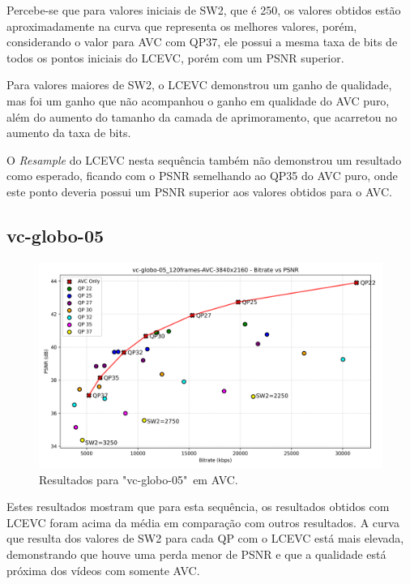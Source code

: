 Percebe-se que para valores iniciais de SW2, que é 250, os valores
obtidos estão aproximadamente na curva que representa os melhores valores, porém, considerando
o valor para \acrshort{AVC} com QP37, ele possui a mesma taxa de bits de todos os pontos
iniciais do \acrshort{LCEVC}, porém com um \acrshort{PSNR} superior.

Para valores maiores de SW2, o \acrshort{LCEVC} demonstrou um ganho de qualidade, mas foi
um ganho que não acompanhou o ganho em qualidade do \acrshort{AVC} puro, além do aumento
do tamanho da camada de aprimoramento, que acarretou no aumento da taxa de bits.

O \textit{Resample} do \acrshort{LCEVC} nesta sequência também não demonstrou um resultado
como esperado, ficando com o \acrshort{PSNR} semelhando ao QP35 do \acrshort{AVC} puro,
onde este ponto deveria possui um \acrshort{PSNR} superior aos valores obtidos para o \acrshort{AVC}.

\newpage
\subsection{vc-globo-05}

\begin{figure}[h]
    \centering
    \includegraphics[width=1.0\textwidth]{img/vc-globo-05_120frames-AVC.png}
    \caption{Resultados para "vc-globo-05"\ em \acrshort{AVC}. \cite{globo_video_uhd}}
    \label{fig:vc-globo-05}
\end{figure}

Estes resultados mostram que para esta sequência, os resultados obtidos com \acrshort{LCEVC}
foram acima da média em comparação com outros resultados. A curva que resulta dos valores
de SW2 para cada QP com o \acrshort{LCEVC} está mais elevada, demonstrando que houve uma perda
menor de \acrshort{PSNR} e que a qualidade está próxima dos vídeos com somente \acrshort{AVC}.

